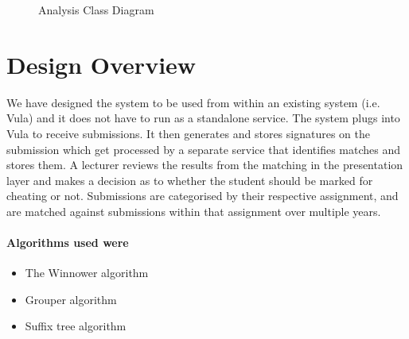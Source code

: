 \documentclass[11pt,a4paper]{article}
\begin{document}
\begin{figure}[h!]
  \caption{Analysis Class Diagram}
  \label{fig:analysisclass}
\end{figure}

\section{Design Overview}
\label{s:design-overview}

We have designed the system to be used from within an existing system (i.e. Vula) and it does not have to run as a standalone service. The system plugs into Vula to receive submissions. It then generates and stores signatures on the submission which get processed by a separate service that identifies matches and stores them. A lecturer reviews the results from the matching in the presentation layer and makes a decision as to whether the student should be marked for cheating or not. Submissions are categorised by their respective assignment, and are matched against submissions within that assignment over multiple years.

\paragraph{Algorithms used were}
\begin{itemize}
    \item The Winnower algorithm
    \item Grouper algorithm
    \item Suffix tree algorithm
\end{itemize}
\end{document}
